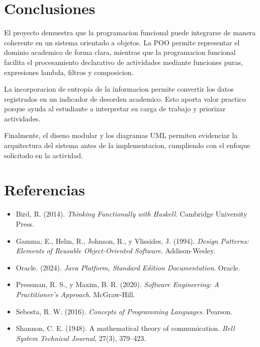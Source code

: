 \documentclass[12pt]{article}
\begin{document}
\section{Conclusiones}

El proyecto demuestra que la programacion funcional puede integrarse de manera coherente en un sistema orientado a objetos. La POO permite representar el dominio academico de forma clara, mientras que la programacion funcional facilita el procesamiento declarativo de actividades mediante funciones puras, expresiones lambda, filtros y composicion.

La incorporacion de entropia de la informacion permite convertir los datos registrados en un indicador de desorden academico. Esto aporta valor practico porque ayuda al estudiante a interpretar su carga de trabajo y priorizar actividades.

Finalmente, el diseno modular y los diagramas UML permiten evidenciar la arquitectura del sistema antes de la implementacion, cumpliendo con el enfoque solicitado en la actividad.

\section{Referencias}

\begin{itemize}
    \item Bird, R. (2014). \textit{Thinking Functionally with Haskell}. Cambridge University Press.
    \item Gamma, E., Helm, R., Johnson, R., y Vlissides, J. (1994). \textit{Design Patterns: Elements of Reusable Object-Oriented Software}. Addison-Wesley.
    \item Oracle. (2024). \textit{Java Platform, Standard Edition Documentation}. Oracle.
    \item Pressman, R. S., y Maxim, B. R. (2020). \textit{Software Engineering: A Practitioner's Approach}. McGraw-Hill.
    \item Sebesta, R. W. (2016). \textit{Concepts of Programming Languages}. Pearson.
    \item Shannon, C. E. (1948). A mathematical theory of communication. \textit{Bell System Technical Journal}, 27(3), 379--423.
\end{itemize}
\end{document}
